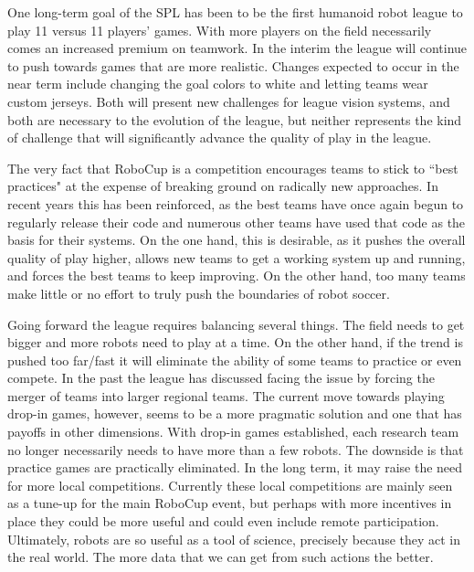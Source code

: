 \documentclass{llncs}
\begin{document}
One long-term goal
of the SPL has been to be the first humanoid robot league to play 11 versus 11 players' games.
With more players on the field necessarily comes an increased premium on teamwork.
In the interim the league will continue to push towards games that are more realistic.
Changes expected to occur in the near term include changing the goal colors to white
and letting teams wear custom jerseys. Both will present new challenges for league vision
systems, and both are necessary to the evolution of the league, but neither represents the
kind of challenge that will significantly advance the quality of play in the league. 

The very fact that RoboCup is a competition
encourages teams to stick to ``best practices" at the expense of breaking ground on
radically new approaches. In recent years this has been reinforced, as the best teams
have once again begun to regularly release their code and numerous other teams have
used that code as the basis for their systems. On the one hand, this is desirable,
as it pushes the overall quality of play higher, allows new teams to get a working
system up and running, and forces the best teams to keep improving. On the other
hand, too many teams make little or no effort to truly push the boundaries of robot
soccer. 

Going forward the league requires balancing several things. The field
needs to get bigger and more robots need to play at a time. On the other hand, if the
trend is pushed too far/fast it will eliminate the ability of some teams to practice or
even compete. In the past the league has discussed facing the issue by forcing the
merger of teams into larger regional teams. The current move towards playing drop-in
games, however, seems to be a more pragmatic solution and one that has payoffs
in other dimensions. With drop-in games established, each research team no longer necessarily needs to have more
than a few robots. The downside is that practice games are practically eliminated. In the long term, it may raise 
the need for more local competitions. Currently these local competitions
are mainly seen as a tune-up for the main RoboCup event, but perhaps with more incentives in place
they could be more useful and could even include remote participation. Ultimately,
robots are so useful as a tool of science, precisely because they act in the real world. The
more data that we can get from such actions the better.
\end{document}
